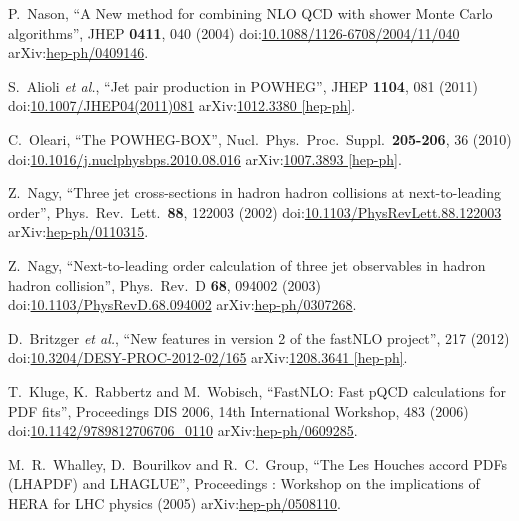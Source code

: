 \begin{thebibliography}{99}
P.~Nason, ``A New method for combining NLO QCD with shower Monte Carlo algorithms'', JHEP {\bf 0411}, 040 (2004) doi:\href{http://dx.doi.org/10.1088/1126-6708/2004/11/040}{10.1088/1126-6708/2004/11/040} arXiv:\href{https://arxiv.org/abs/hep-ph/0409146}{hep-ph/0409146}.

S.~Alioli {\it et al.}, ``Jet pair production in POWHEG'', JHEP {\bf 1104}, 081 (2011) doi:\href{http://dx.doi.org/10.1007/JHEP04(2011)081}{10.1007/JHEP04(2011)081} arXiv:\href{https://arxiv.org/abs/1012.3380}{1012.3380 [hep-ph]}.

C.~Oleari, ``The POWHEG-BOX'', Nucl.\ Phys.\ Proc.\ Suppl.\ {\bf 205-206}, 36 (2010) doi:\href{http://dx.doi.org/10.1016/j.nuclphysbps.2010.08.016}{10.1016/j.nuclphysbps.2010.08.016} arXiv:\href{https://arxiv.org/abs/1007.3893}{1007.3893 [hep-ph]}.

Z.~Nagy, ``Three jet cross-sections in hadron hadron collisions at next-to-leading order'', Phys.\ Rev.\ Lett.\ {\bf 88}, 122003 (2002) doi:\href{http://dx.doi.org/10.1103/PhysRevLett.88.122003}{10.1103/PhysRevLett.88.122003} arXiv:\href{https://arxiv.org/abs/hep-ph/0110315}{hep-ph/0110315}.

Z.~Nagy, ``Next-to-leading order calculation of three jet observables in hadron hadron collision'', Phys.\ Rev.\ D {\bf 68}, 094002 (2003) doi:\href{http://dx.doi.org/10.1103/PhysRevD.68.094002}{10.1103/PhysRevD.68.094002} arXiv:\href{https://arxiv.org/abs/hep-ph/0307268}{hep-ph/0307268}.

D.~Britzger {\it et al.}, ``New features in version 2 of the fastNLO project'', 217 (2012) doi:\href{http://dx.doi.org/10.3204/DESY-PROC-2012-02/165}{10.3204/DESY-PROC-2012-02/165} arXiv:\href{https://arxiv.org/abs/1208.3641}{1208.3641 [hep-ph]}.

T.~Kluge, K.~Rabbertz and M.~Wobisch, ``FastNLO: Fast pQCD calculations for PDF fits'', Proceedings DIS 2006, 14th International Workshop, 483 (2006) doi:\href{http://dx.doi.org/10.1142/9789812706706\_0110}{10.1142/9789812706706\_0110} arXiv:\href{https://arxiv.org/abs/hep-ph/0609285}{hep-ph/0609285}.

M.~R.~Whalley, D.~Bourilkov and R.~C.~Group, ``The Les Houches accord PDFs (LHAPDF) and LHAGLUE'', Proceedings : Workshop on the implications of HERA for LHC physics (2005) arXiv:\href{https://arxiv.org/abs/hep-ph/0508110}{hep-ph/0508110}.


\end{thebibliography}

